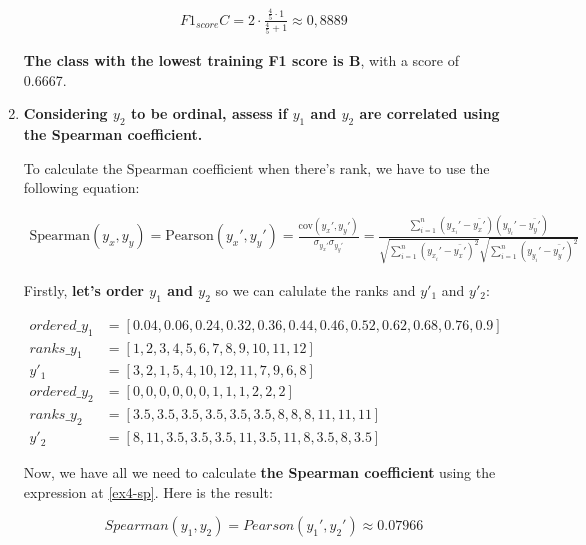 \documentclass[12pt]{article}
\begin{document}
\begin{enumerate}[leftmargin=\labelsep]
    \[
        \begin{aligned}
            F1_{score} C = 2 \cdot \frac{{ \frac{4}{5} \cdot 1 }}{{ \frac{4}{5} + 1 }} \approx 0,8889
        \end{aligned}
    \]

    \textbf{The class with the lowest training F1 score is B}, with a score of 0.6667.

    \item \textbf{Considering $y_2$ to be ordinal, assess if $y_1$ and $y_2$ are correlated using the Spearman coefficient.}

    \vskip 0.3cm

    To calculate the Spearman coefficient when there's rank, we have to use the following equation:

    \begin{equation}\label{ex4-sp}
        \begin{split}
            \text{Spearman}(y_x, y_y) = \text{Pearson}(y_x', y_y') = \frac{\text{cov}(y_x', y_y')}{\sigma_{y_x'} \sigma_{y_y'}}
            = \frac{\sum_{i=1}^{n} (y_{x_i}' - \bar{y_x'})(y_{y_i}' - \bar{y_y'})}{\sqrt{\sum_{i=1}^{n} (y_{x_i}' - \bar{y_x'})^2}\sqrt{\sum_{i=1}^{n} (y_{y_i}' - \bar{y_y'})^2}}
        \end{split}
    \end{equation}

    Firstly, \textbf{let's order $y_1$ and $y_2$} so we can calulate the ranks and $y'_1$ and $y'_2$:

    \begin{align*}
        ordered\_y_{1} & = [0.04, 0.06, 0.24, 0.32, 0.36, 0.44, 0.46, 0.52, 0.62, 0.68, 0.76, 0.9]\\
        ranks\_y_{1}   & = [1,2,3,4,5,6,7,8,9,10,11,12]\\
        y'_{1}         & = [3,2,1,5,4,10,12,11,7,9,6,8]\\
        ordered\_y_{2} & = [0,0,0,0,0,0,1,1,1,2,2,2]\\
        ranks\_y_{2}   & = [3.5, 3.5, 3.5, 3.5, 3.5, 3.5, 8, 8, 8, 11, 11, 11]\\
        y'_{2}         & = [8, 11, 3.5, 3.5, 3.5, 11, 3.5, 11, 8, 3.5, 8, 3.5]
    \end{align*}

    Now, we have all we need to calculate \textbf{the Spearman coefficient} using the expression at \eqref{ex4-sp}. Here is the result:

    \[
        Spearman(y_{1}, y_{2}) = Pearson(y_{1}', y_{2}') \approx 0.07966
    \]


\end{enumerate}
\end{document}
